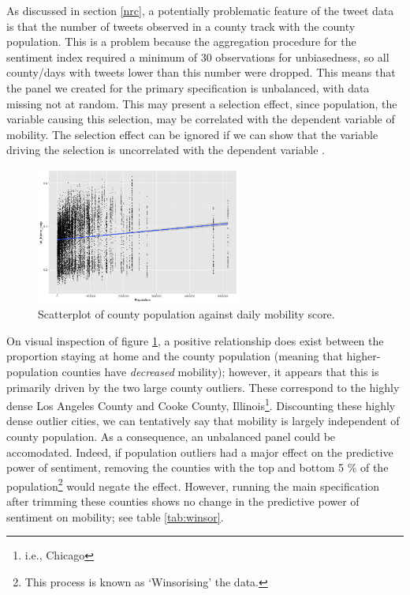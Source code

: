\documentclass[12pt,a4]{article}
\begin{document}
As discussed in section \ref{nrc}, a potentially problematic feature of the tweet data is that the number of tweets observed in a county track with the county population. This is a problem because the aggregation procedure for the sentiment index required a minimum of 30 observations for unbiasedness, so all county/days with tweets lower than this number were dropped. This means that the panel we created for the primary specification is unbalanced, with data missing not at random. This may present a selection effect, since population, the variable causing this selection, may be correlated with the dependent variable of mobility. The selection effect can be ignored if we can show that the variable driving the selection is uncorrelated with the dependent variable \parencite[552]{wooldridgeEconometricAnalysisCross2010}. 
\begin{figure}[!htb]
  \centering
  \caption{Scatterplot of county population against daily mobility score.}
  \label{popvsmobil}
  \includegraphics[width=0.6\textwidth]{figs/popvsmobil.png}
\end{figure}
On visual inspection of figure \ref{popvsmobil}, a positive relationship does exist between the proportion staying at home and the county population (meaning that higher-population counties have \textit{decreased} mobility); however, it appears that this is primarily driven by the two large county outliers. These correspond to the highly dense Los Angeles County and Cooke County, Illinois\footnote{i.e., Chicago}. Discounting these highly dense outlier cities, we can tentatively say that mobility is largely independent of county population. As a consequence, an unbalanced panel could be accomodated. Indeed, if population outliers had a major effect on the predictive power of sentiment, removing the counties with the top and bottom 5 \% of the population\footnote{This process is known as `Winsorising' the data.} would negate the effect. However, running the main specification after trimming these counties shows no change in the predictive power of sentiment on mobility; see table \ref{tab:winsor}.
\end{document}
